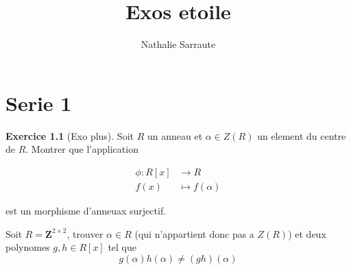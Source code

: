 \documentclass[a4paper,11pt,french]{report}
\title{Exos etoile}
\author{Nathalie Sarraute}
\theoremstyle{plain}
\theoremstyle{definition}
\newtheorem{exercise}{Exercice}[chapter]
\begin{document}
\maketitle
\tableofcontents
\chapter{Serie 1}
\begin{exercise}[Exo plus]
Soit $R$ un anneau et $\alpha \in Z(R)$ un element du centre de $R$. Montrer que l'application

\begin{align}
\phi : R[x] & \to R \\
f(x) & \mapsto f(\alpha)
\end{align}

est un morphisme d'anneuax surjectif.

Soit $R=\mathbf{Z}^{2\times 2}$, trouver $\alpha \in R$ (qui n'appartient donc pas a $Z(R)$) et deux polynomes $g,h\in R[x]$ tel que
$$
g(\alpha)h(\alpha)\neq (gh)(\alpha)
$$
\end{exercise}
\end{document}
